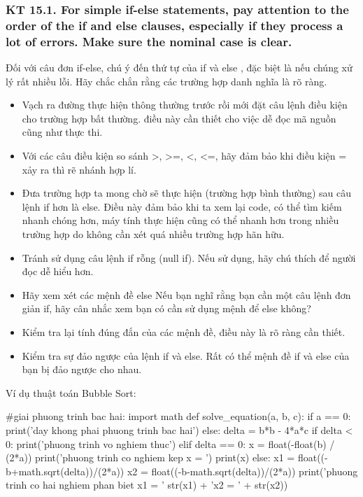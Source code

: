 \documentclass[12pt]{report}
\begin{document}
\subsubsection{KT 15.1. For simple if-else statements, pay attention to the order of the if and else clauses, especially if they process a lot of errors. Make sure the nominal case is clear.}
Đối với câu đơn if-else, chú ý đến thứ tự của if và else , đặc biệt là nếu chúng xử lý rất nhiều lỗi. Hãy chắc chắn rằng các trường hợp danh nghĩa là rõ ràng. 
\begin{itemize}
	\item Vạch ra đường thực hiện thông thường trước rồi mới đặt câu lệnh điều kiện cho trường hợp bất thường. điều này cần thiết cho việc dễ đọc mã nguồn cũng như thực thi.
	\item Với các câu điều kiện so sánh >, >=, <, <=, hãy đảm bảo khi điều kiện = xảy ra thì rẽ nhánh hợp lí.
	\item Đưa trường hợp ta mong chờ sẽ thực hiện (trường hợp bình thường) sau câu lệnh if hơn là else. Điều này đảm bảo khi ta xem lại code, có thể tìm kiếm nhanh chóng hơn, máy tính thực hiện cũng có thể nhanh hơn trong nhiều trường hợp do không cần xét quá nhiều trường hợp hãn hữu.
	\item Tránh sử dụng câu lệnh if rỗng (null if). Nếu sử dụng, hãy chú thích để người đọc dễ hiểu hơn.
	\item Hãy xem xét các mệnh đề else Nếu bạn nghĩ rằng bạn cần một câu lệnh đơn giản if, hãy cân nhắc xem bạn có cần sử dụng mệnh để else không?
	\item Kiểm tra lại tính đúng đắn của các mệnh đề, điều này là rõ ràng cần thiết.
	\item Kiểm tra sự đảo ngược của lệnh if và else. Rất có thể mệnh đề if và else của bạn bị đảo ngược cho nhau. 
\end{itemize}
Ví dụ thuật toán Bubble Sort:
\begin{python}
#giai phuong trinh bac hai:
import math
def solve_equation(a, b, c):
	if a == 0:
		print('day khong phai phuong trinh bac hai')
	else:
		delta = b*b - 4*a*c
		if delta < 0:
			print('phuong trinh vo nghiem thuc')
		elif delta == 0:
			x = float(-float(b) / (2*a))
			print('phuong trinh co nghiem kep x = ')
			print(x)
		else:
			x1 = float((-b+math.sqrt(delta))/(2*a))
			x2 = float((-b-math.sqrt(delta))/(2*a))
			print('phuong trinh co hai nghiem phan biet x1 = ' 
				str(x1) + 'x2 = ' + str(x2))
\end{python}
\end{document}
